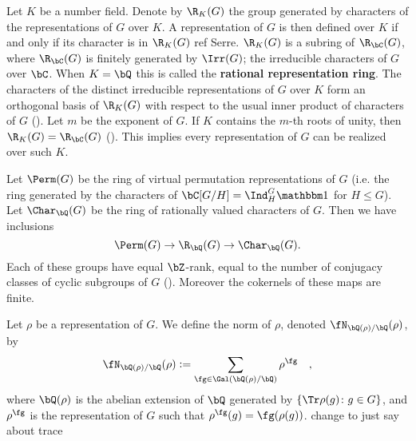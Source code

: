 
Let $K$ be a number field. Denote by $\R_K(G)$ the group generated by characters of the representations of $G$ over $K$. A representation of $G$ is then defined over $K$ if and only if its character is in $\R_K(G)$ {\color{red} ref Serre}.
$\R_K(G)$ is a subring of $\R_{\bC}(G)$, where $\R_{\bC}(G)$ is finitely generated by $\Irr(G)$; the irreducible characters of $G$ over $\bC$.
When $K = \bQ$ this is called the \textbf{rational representation ring}.
The characters of the distinct irreducible representations of $G$ over $K$ form an orthogonal basis of $\R_K(G)$ with respect to the usual inner product of characters of $G$ (\cite[Proposition 32]{Serre}).
Let $m$ be the exponent of $G$. If $K$ contains the $m$-th roots of unity, then $\R_K(G) = \R_{\bC}(G)$ (\cite[Theorem 24]{Serre}). This implies every representation of $G$ can be realized over such $K$. 
\vspace{1em}

Let $\Perm(G)$ be the ring of virtual permutation representations of $G$ (i.e. the ring generated by the characters of $\bC[G / H] = \Ind_{H}^G \trivial$ for $H \leq G$). Let $\Char_{\bQ}(G)$ be the ring of rationally valued characters of $G$. Then we have inclusions 
\[ \Perm(G) \to \R_{\bQ}(G) \to \Char_{\bQ}(G). \]
Each of these groups have equal $\bZ$-rank, equal to the number of conjugacy classes of cyclic subgroups of $G$ (\cite[Chapter 13, \S13.1]{Serre}). Moreover the cokernels of these maps are finite.

\begin{defn}\label{rho-norm}
    Let $\rho$ be a representation of $G$. We define the norm of $\rho$, denoted $\repnorm{\rho}$, by 
    \[
    \repnorm{\rho} \defeq \sum_{\fg \in \Gal(\bQ(\rho)/\bQ)}  \rho^\fg \quad,
    \]
    where $\bQ(\rho)$ is the abelian extension of $\bQ$ generated by $\{ \Tr \rho(g) \colon g \in G \}$, and $\rho^\fg$ is the representation of $G$ such that $\rho^{\fg}(g) = \fg(\rho(g))$. {\color{red} change to just say about trace}
\end{defn}

